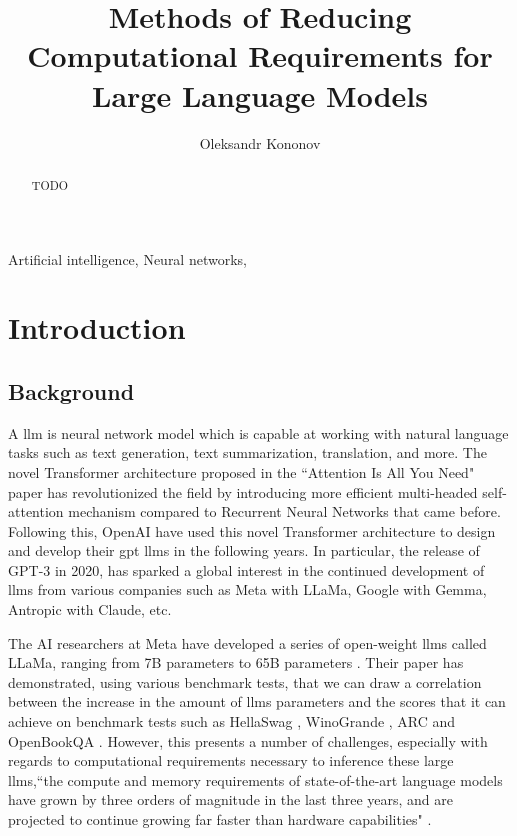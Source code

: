 \documentclass{ifacconf}
\begin{document}
	
	\begin{frontmatter}
		
		\title{Methods of Reducing Computational Requirements for Large Language Models} 
		
		\author[First]{Oleksandr Kononov} 
		
		\address[First]{South East Technological University, 
			Cork Road, Waterford, Ireland (e-mail: 20071032@mail.wit.ie).}
		\begin{abstract}                %
			TODO
		\end{abstract}
		
		\begin{keyword}
			Artificial intelligence, Neural networks, 
		\end{keyword}
		
	\end{frontmatter}
	\section{Introduction}
	\subsection{Background}
	A \gls{llm} is neural network model which is capable at working with natural language tasks such as text generation, text summarization, translation, and more. The novel Transformer architecture proposed in the ``Attention Is All You Need" paper \cite{vaswani2017attentionneed} has revolutionized the field by introducing more efficient multi-headed self-attention mechanism compared to Recurrent Neural Networks that came before.
	Following this, OpenAI have used this novel Transformer architecture to design and develop their \gls{gpt} \glspl{llm} in the following years. In particular, the release of GPT-3 in 2020, has sparked a global interest in the continued development of \glspl{llm} from various companies such as Meta with LLaMa, Google with Gemma, Antropic with Claude, etc.
	
	The AI researchers at Meta have developed a series of open-weight \glspl{llm} called LLaMa, ranging from 7B parameters to 65B parameters \cite{touvron2023llamaopenefficientfoundation}. Their paper has demonstrated, using various benchmark tests, that we can draw a correlation between the increase in the amount of \glspl{llm} parameters and the scores that it can achieve on benchmark tests such as HellaSwag \cite{zellers2019hellaswagmachinereallyfinish}, WinoGrande \cite{sakaguchi2019winograndeadversarialwinogradschema}, ARC \cite{clark2018thinksolvedquestionanswering} and OpenBookQA \cite{mihaylov2018suitarmorconductelectricity}. However, this presents a number of challenges, especially with regards to computational requirements necessary to inference these large \glspl{llm},``the compute and memory requirements of state-of-the-art language models have grown by three orders of magnitude in the last three years, and are projected to continue growing far faster than hardware capabilities" \cite[p.~97]{bommasani2022opportunitiesrisksfoundationmodels}.
	
\end{document}
